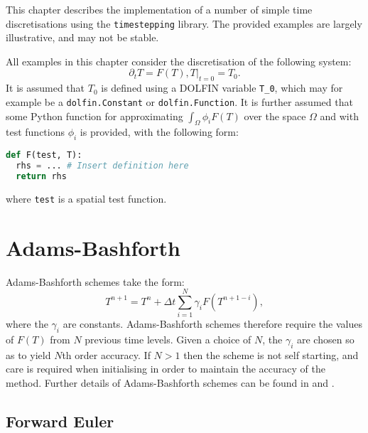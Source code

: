 \documentclass[a4paper]{book}
\begin{document}
This chapter describes the implementation of a number of simple time
discretisations using the \verb+timestepping+ library. The provided examples are
largely illustrative, and may not be stable.

All examples in this chapter consider
the discretisation of the following system:
\begin{subequations}
  \begin{equation}\label{eqn:t_timestep}
    \partial_t T = F(T),
  \end{equation}
  \begin{equation}\label{eqn:t_init}
    \left. T \right|_{t = 0} = T_0.
  \end{equation}
\end{subequations}
It is assumed that $T_0$ is defined using a DOLFIN variable \verb+T_0+, which
may for example be a \verb+dolfin.Constant+ or \verb+dolfin.Function+. It is
further assumed that some Python function for approximating
$\int_\Omega \phi_i F(T)$ over the space $\Omega$ and with test functions
$\phi_i$ is provided, with the following form:
\begin{lstlisting}[language = python, frame = single, basicstyle=\footnotesize]
def F(test, T):
  rhs = ... # Insert definition here
  return rhs
\end{lstlisting}
where \verb+test+ is a spatial test function.

\section{Adams-Bashforth}

Adams-Bashforth schemes take the form:
\begin{equation}
  T^{n + 1} = T^n + \Delta t \sum_{i = 1}^N \gamma_i F( T^{n + 1 - i}),
\end{equation}
where the $\gamma_i$ are constants. Adams-Bashforth schemes therefore require
the values of $F(T)$ from $N$ previous time levels. Given a choice of $N$, the
$\gamma_i$ are chosen so as to yield $N$th order accuracy. If $N > 1$ then the
scheme is not self starting, and care is required when initialising in order to
maintain the accuracy of the method. Further details of Adams-Bashforth schemes
can be found in \citet[section 2.1]{iserles2009} and
\citet[section III.1]{hairer1987}.

\subsection{Forward Euler}\label{sect:fe}
\end{document}
